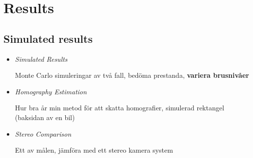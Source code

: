 \documentclass{beamer}
\renewcommand{\a}{\r{a}\xspace}
\renewcommand{\aa}{\"a\xspace}
\renewcommand{\o}{\"o\xspace}
\begin{document}
\section{Results}

\subsection{Simulated results}

\note
{
	\begin{itemize}
		\item \textit{Simulated Results}

		Monte Carlo simuleringar av tv\a{} fall, bed\o{}ma prestanda, \textbf{variera brusniv\a{}er}

		\item \textit{Homography Estimation}

		Hur bra \a{}r min metod f\o{}r att skatta homografier, simulerad rektangel (baksidan av en bil)

		\item \textit{Stereo Comparison}

		Ett av m\a{}len, j\aa{}mf\o{}ra med ett stereo kamera system
	\end{itemize}
}
\end{document}
